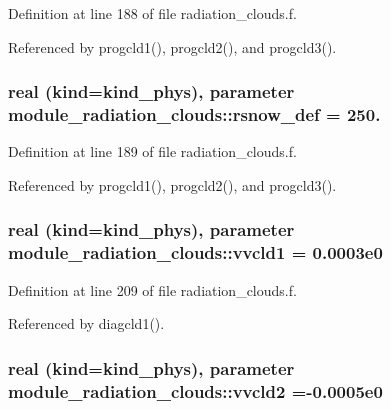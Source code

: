 Definition at line 188 of file radiation\+\_\+clouds.\+f.



Referenced by progcld1(), progcld2(), and progcld3().

\subsubsection[{\texorpdfstring{rsnow\+\_\+def}{rsnow_def}}]{\setlength{\rightskip}{0pt plus 5cm}real (kind=kind\+\_\+phys), parameter module\+\_\+radiation\+\_\+clouds\+::rsnow\+\_\+def = 250.\hspace{0.3cm}{\ttfamily [private]}}\hypertarget{group__module__radiation__clouds_ga2b68c4a206e17cb59597f6c4dffc7c1a}{}\label{group__module__radiation__clouds_ga2b68c4a206e17cb59597f6c4dffc7c1a}


Definition at line 189 of file radiation\+\_\+clouds.\+f.



Referenced by progcld1(), progcld2(), and progcld3().

\subsubsection[{\texorpdfstring{vvcld1}{vvcld1}}]{\setlength{\rightskip}{0pt plus 5cm}real (kind=kind\+\_\+phys), parameter module\+\_\+radiation\+\_\+clouds\+::vvcld1 = 0.\+0003e0\hspace{0.3cm}{\ttfamily [private]}}\hypertarget{group__module__radiation__clouds_ga6ec3c0444de53580befd4bb4d39844d3}{}\label{group__module__radiation__clouds_ga6ec3c0444de53580befd4bb4d39844d3}


Definition at line 209 of file radiation\+\_\+clouds.\+f.



Referenced by diagcld1().

\subsubsection[{\texorpdfstring{vvcld2}{vvcld2}}]{\setlength{\rightskip}{0pt plus 5cm}real (kind=kind\+\_\+phys), parameter module\+\_\+radiation\+\_\+clouds\+::vvcld2 =-\/0.\+0005e0\hspace{0.3cm}{\ttfamily [private]}}\hypertarget{group__module__radiation__clouds_ga67962e77fb073cc25cafaaba0c2fa833}{}\label{group__module__radiation__clouds_ga67962e77fb073cc25cafaaba0c2fa833}



